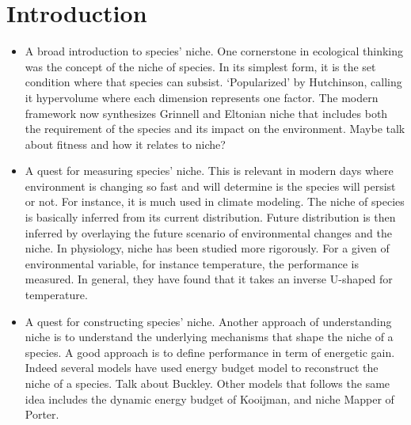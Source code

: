 \section*{Introduction}
\begin{itemize}
\item A broad introduction to species' niche. 
One  cornerstone in ecological thinking was the concept of the niche of species.
In its simplest form, it is the set condition where that species can subsist.
`Popularized' by Hutchinson, calling it hypervolume where each dimension represents one factor. 
The modern framework now synthesizes Grinnell and Eltonian niche that includes both the requirement of the species and its impact on the environment.
Maybe talk about fitness and how it relates to niche?
%
\item A quest for measuring species' niche.
This is relevant in modern days where environment is changing so fast and will determine is the species will persist or not.  
For instance, it is much used in climate modeling.
The niche of species is basically inferred from its current distribution.
Future distribution is then inferred by overlaying the future scenario of environmental changes and the niche.
In physiology, niche has been studied more rigorously. 
For a given of environmental variable, for instance temperature, the performance is measured.
In general, they have found that it takes an inverse U-shaped for temperature.

\item A quest for constructing species' niche.
Another approach of understanding niche is to understand the underlying mechanisms that shape the niche of a species.
A good approach is to define performance in term of energetic gain.
Indeed several models have used energy budget model to reconstruct the niche of a species.
Talk about Buckley.
Other models that follows the same idea includes the dynamic energy budget of Kooijman, and niche Mapper of Porter.



\end{itemize}
